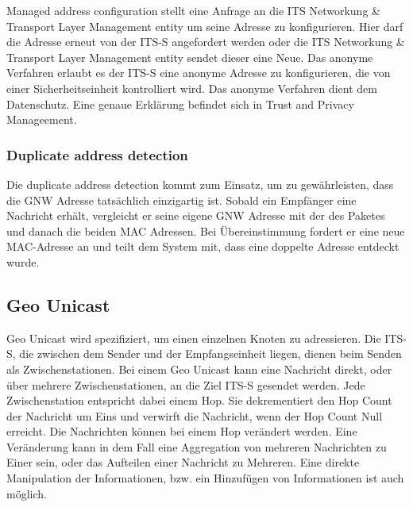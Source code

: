 Managed address configuration stellt eine Anfrage an die ITS Networkung \& Transport Layer Management entity um seine Adresse zu konfigurieren. Hier darf die Adresse erneut von der \ac{ITS-S} angefordert werden oder die ITS Networkung \& Transport Layer Management entity sendet dieser eine Neue. Das anonyme Verfahren erlaubt es der \ac{ITS-S} eine anonyme Adresse zu konfigurieren, die von einer Sicherheitseinheit kontrolliert wird. Das anonyme Verfahren dient dem Datenschutz. Eine genaue Erklärung befindet sich in Trust and Privacy Manageement. 

\subsubsection{Duplicate address detection}
Die duplicate address detection kommt zum Einsatz, um zu gewährleisten, dass die \acl{GNW} Adresse tatsächlich einzigartig ist. Sobald ein Empfänger eine Nachricht erhält, vergleicht er seine eigene \acl{GNW} Adresse mit der des Paketes und danach die beiden MAC Adressen. Bei Übereinstimmung fordert er eine neue MAC-Adresse an und teilt dem System mit, dass eine doppelte Adresse entdeckt wurde. \cite{etsi302636-4-1}

\subsection{Geo Unicast}
Geo Unicast wird spezifiziert, um einen einzelnen Knoten zu adressieren. Die \ac{ITS-S}, die zwischen dem Sender und der Empfangseinheit liegen, dienen beim Senden als Zwischenstationen. Bei einem Geo Unicast kann eine Nachricht direkt, oder über mehrere Zwischenstationen, an die Ziel \ac{ITS-S} gesendet werden. Jede Zwischenstation entspricht dabei einem Hop. Sie dekrementiert den Hop Count der Nachricht um Eins und verwirft die Nachricht, wenn der Hop Count Null erreicht. Die Nachrichten können bei einem Hop verändert werden. Eine Veränderung kann in dem Fall eine Aggregation von mehreren Nachrichten zu Einer sein, oder das Aufteilen einer Nachricht zu Mehreren. Eine direkte Manipulation der Informationen, bzw. ein Hinzufügen von Informationen ist auch möglich.


